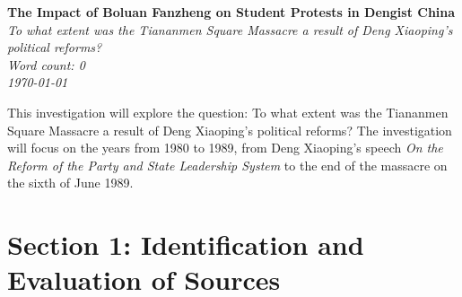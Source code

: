 \documentclass[letterpaper, 12pt]{article}
\author{Grant Lemons}
\date{\today}
\newcommand{\thetitle}{The Impact of Boluan Fanzheng on Student Protests in Dengist China}
\newcommand{\researchquestion}{To what extent was the Tiananmen Square Massacre a result of Deng Xiaoping's political reforms?}
\newcommand{\wordcount}{0}%
\begin{document}
\begin{titlepage}
\begin{center}
\vspace*{6.3cm}
\textbf{\Huge \thetitle}\\
\textit{\researchquestion}\\
\vspace{2.5cm}
\textit{Word count: \wordcount}\\
\vspace{0.6cm}
\textit{\today}\\

\end{center}
\end{titlepage}

\tableofcontents
\newpage

This investigation will explore the question: To what extent was the Tiananmen Square Massacre a result of Deng Xiaoping's political reforms? The investigation will focus on the years from 1980 to 1989, from Deng Xiaoping’s speech \textit{On the Reform of the Party and State Leadership System} to the end of the massacre on the sixth of June 1989.

\section{Section 1: Identification and Evaluation of Sources}


\end{document}
